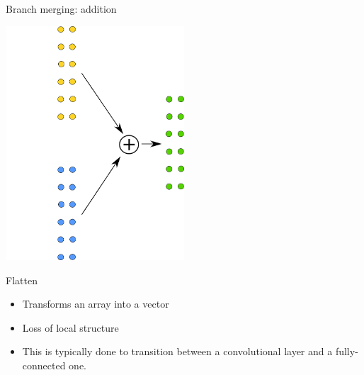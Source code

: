 \documentclass[xcolor=pdftex,dvipsnames,table,mathserif]{beamer}
\begin{document}
\begin{frame}{Branch merging: addition}

  \begin{center}
    \includegraphics[width=0.5\textwidth]{addition.png}
  \end{center}

\end{frame}

\begin{frame}{Flatten}

  \begin{itemize}
  \item Transforms an array into a vector
  \item Loss of local structure
  \item This is typically done to transition between a convolutional layer and a fully-connected one.
  \end{itemize}

\end{frame}





\end{document}
